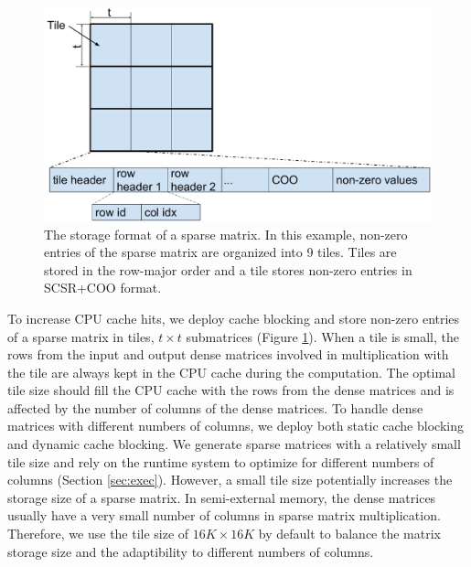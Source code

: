\begin{figure}
\centering
\includegraphics[scale=0.3]{SpMM_figs/sparse_mat.pdf}
\caption{The storage format of a sparse matrix. In this example, non-zero
entries of the sparse matrix are organized into 9 tiles. Tiles are stored in
the row-major order and a tile stores non-zero entries in SCSR+COO format.}
\label{sparse_mat}
\end{figure}

To increase CPU cache hits, we deploy cache blocking \cite{Im04} and store
non-zero entries of a sparse matrix in tiles, $t \times t$ submatrices (Figure
\ref{sparse_mat}).
When a tile is small, the rows from the input and output dense matrices
involved in multiplication with the tile are always kept in the CPU cache
during the computation. The optimal tile size should fill the CPU cache
with the rows from the dense matrices and is affected by the number of columns
of the dense matrices. To handle dense matrices with different numbers
of columns, we deploy both static cache blocking and dynamic cache blocking.
We generate sparse matrices with a relatively small tile size and
rely on the runtime system
to optimize for different numbers of columns (Section \ref{sec:exec}).
However, a small tile size potentially increases the storage size of a sparse
matrix. In semi-external memory, the dense matrices usually have
a very small number of columns in sparse matrix multiplication. Therefore, we
use the tile size of $16K \times 16K$ by default to balance the matrix storage
size and the adaptibility to different numbers of columns.


